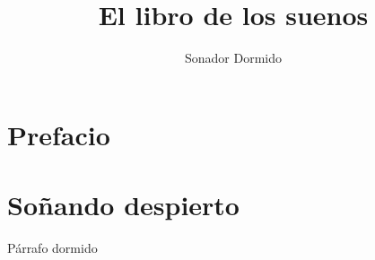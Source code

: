 \documentclass{book}
\begin{document}
    \title{\textbf{El libro de los suenos}}
    \author{Sonador Dormido}
    \date{}

\maketitle

\tableofcontents

\chapter*{Prefacio}

\chapter{So\~nando despierto}

    P\'arrafo dormido
\end{document}
